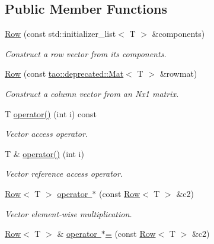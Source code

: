 \subsection*{Public Member Functions}
\begin{DoxyCompactItemize}
\item 
\mbox{\hyperlink{classtao_1_1deprecated_1_1_row_a4666537e6b41ef3af827ccbe672d25a2}{Row}} (const std\+::initializer\+\_\+list$<$ T $>$ \&components)
\begin{DoxyCompactList}\small\item\em Construct a row vector from its components. \end{DoxyCompactList}\item 
\mbox{\label{classtao_1_1deprecated_1_1_row_a7f28f0351cb93664f791ede85ac2568d}} 
\mbox{\hyperlink{classtao_1_1deprecated_1_1_row_a7f28f0351cb93664f791ede85ac2568d}{Row}} (const \mbox{\hyperlink{classtao_1_1deprecated_1_1_mat}{tao\+::deprecated\+::\+Mat}}$<$ T $>$ \&rowmat)
\begin{DoxyCompactList}\small\item\em Construct a column vector from an Nx1 matrix. \end{DoxyCompactList}\item 
T \mbox{\hyperlink{classtao_1_1deprecated_1_1_row_abf8099cac43814ff7407d7e3030fbce6}{operator()}} (int i) const
\begin{DoxyCompactList}\small\item\em Vector access operator. \end{DoxyCompactList}\item 
T \& \mbox{\hyperlink{classtao_1_1deprecated_1_1_row_a6f39a8e3d788cb9ee94a3dd8b7b9d110}{operator()}} (int i)
\begin{DoxyCompactList}\small\item\em Vector reference access operator. \end{DoxyCompactList}\item 
\mbox{\hyperlink{classtao_1_1deprecated_1_1_row}{Row}}$<$ T $>$ \mbox{\hyperlink{classtao_1_1deprecated_1_1_row_ab35fdd6c34ca76bcb89a1510fea7eac2}{operator $\ast$}} (const \mbox{\hyperlink{classtao_1_1deprecated_1_1_row}{Row}}$<$ T $>$ \&c2)
\begin{DoxyCompactList}\small\item\em Vector element-\/wise multiplication. \end{DoxyCompactList}\item 
\mbox{\hyperlink{classtao_1_1deprecated_1_1_row}{Row}}$<$ T $>$ \& \mbox{\hyperlink{classtao_1_1deprecated_1_1_row_aa4180f95e280e3dae3153230169f264f}{operator $\ast$=}} (const \mbox{\hyperlink{classtao_1_1deprecated_1_1_row}{Row}}$<$ T $>$ \&c2)

\end{DoxyCompactItemize}
